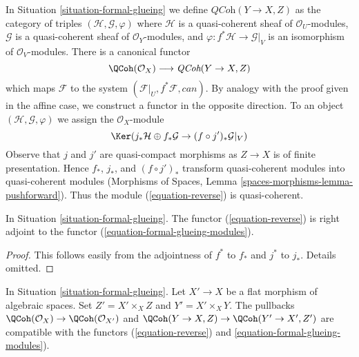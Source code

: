 \noindent
In Situation \ref{situation-formal-glueing} we define
$\textit{QCoh}(Y \to X, Z)$ as the category of
triples $(\mathcal{H}, \mathcal{G}, \varphi)$ where
$\mathcal{H}$ is a quasi-coherent sheaf of
$\mathcal{O}_U$-modules, $\mathcal{G}$ is a quasi-coherent sheaf
of $\mathcal{O}_Y$-modules, and
$\varphi : f^*\mathcal{H} \to \mathcal{G}|_V$ is an isomorphism
of $\mathcal{O}_V$-modules. There is a canonical
functor
\begin{equation}
\label{equation-formal-glueing-modules}
\QCoh(\mathcal{O}_X) \longrightarrow \textit{QCoh}(Y \to X, Z)
\end{equation}
which maps $\mathcal{F}$ to the system
$(\mathcal{F}|_U, f^*\mathcal{F}, can)$.
By analogy with the proof given in the affine case, we construct
a functor in the opposite direction. To an object
$(\mathcal{H}, \mathcal{G}, \varphi)$ we assign the $\mathcal{O}_X$-module
\begin{equation}
\label{equation-reverse}
\Ker(j_*\mathcal{H} \oplus f_*\mathcal{G} \to (f \circ j')_*\mathcal{G}|_V)
\end{equation}
Observe that $j$ and $j'$ are quasi-compact morphisms as
$Z \to X$ is of finite presentation. Hence $f_*$, $j_*$, and $(f \circ j')_*$
transform quasi-coherent modules into quasi-coherent modules
(Morphisms of Spaces, Lemma \ref{spaces-morphisms-lemma-pushforward}).
Thus the module (\ref{equation-reverse}) is quasi-coherent.

\begin{lemma}
\label{lemma-adjoint}
In Situation \ref{situation-formal-glueing}.
The functor (\ref{equation-reverse}) is right adjoint to
the functor (\ref{equation-formal-glueing-modules}).
\end{lemma}

\begin{proof}
This follows easily from the adjointness of $f^*$ to $f_*$
and $j^*$ to $j_*$. Details omitted.
\end{proof}

\begin{lemma}
\label{lemma-reverse-commutes-with-flat-base-change}
In Situation \ref{situation-formal-glueing}.
Let $X' \to X$ be a flat morphism of algebraic spaces.
Set $Z' = X' \times_X Z$ and $Y' = X' \times_X Y$.
The pullbacks $\QCoh(\mathcal{O}_X) \to \QCoh(\mathcal{O}_{X'})$
and $\QCoh(Y \to X, Z) \to \QCoh(Y' \to X', Z')$ are compatible
with the functors (\ref{equation-reverse}) and
\ref{equation-formal-glueing-modules}).
\end{lemma}

